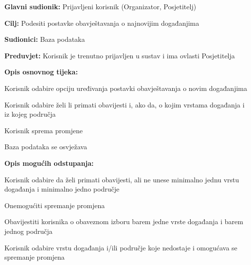 					\noindent {}
					\begin{packed_item}
						
						\item \textbf{Glavni sudionik:} Prijavljeni korisnik (Organizator, Posjetitelj)
						\item  \textbf{Cilj:} Podesiti postavke obavještavanja o najnovijim događanjima
						\item  \textbf{Sudionici:} Baza podataka
						\item  \textbf{Preduvjet:} Korisnik je trenutno prijavljen u sustav i ima ovlasti Posjetitelja
						\item  \textbf{Opis osnovnog tijeka:}
						
						\item[] \begin{packed_enum}
							
							\item Korisnik odabire opciju uređivanja postavki obavještavanja o novim događanjima
							\item Korisnik odabire želi li primati obavijesti i, ako da, o kojim vrstama događanja i iz kojeg područja
							\item Korisnik sprema promjene
							\item Baza podataka se osvježava
							
						\end{packed_enum}
						
						\item  \textbf{Opis mogućih odstupanja:}
						
						\item[] \begin{packed_item}
							
							\item[2.a] Korisnik odabire da želi primati obavijesti, ali ne unese minimalno jednu vrstu događanja i minimalno jedno područje
							\item[] \begin{packed_enum}
								
								\item Onemogućiti spremanje promjena
								\item Obavijestiti korisnika o obaveznom izboru barem jedne vrste događanja i barem jednog područja
								\item Korisnik odabire vrstu događanja i/ili područje koje nedostaje i omogućava se spremanje promjena
								
							\end{packed_enum}
						\end{packed_item}
						
					\end{packed_item}
					
